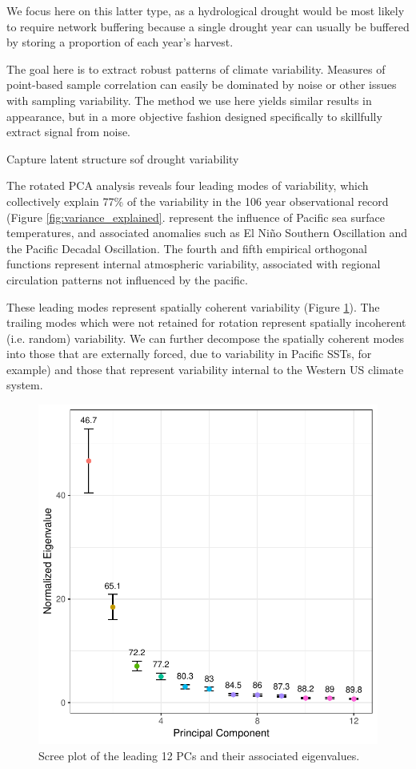\documentclass[fleqn,10pt]{wlscirep}
\begin{document}
We focus here on this latter type, as a hydrological drought would be most likely to require network buffering because a single drought year can usually be buffered by storing a proportion of each year’s harvest.

The goal here is to extract robust patterns of climate variability. Measures of point-based sample correlation can easily be dominated by noise or other issues with sampling variability. The method we use here yields similar results in appearance, but in a more objective fashion designed specifically to skillfully extract signal from noise.

Capture latent structure sof drought variability

The rotated PCA analysis reveals four leading modes of variability, which collectively explain 77\% of the variability in the 106 year observational record (Figure \ref{fig:variance_explained}. represent the influence of Pacific sea surface temperatures, and associated anomalies such as El Ni\~no Southern Oscillation and the Pacific Decadal Oscillation. The fourth and fifth empirical orthogonal functions represent internal atmospheric variability, associated with regional circulation patterns not influenced by the pacific.

These leading modes represent spatially coherent variability (Figure \ref{fig:reofs}). The trailing modes which were not retained for rotation represent spatially incoherent (i.e. random) variability. We can further decompose the spatially coherent modes into those that are externally forced, due to variability in Pacific SSTs, for example) and those that represent variability internal to the Western US climate system.

\begin{figure}[!htbp]
\centering
\includegraphics[width=.3\linewidth]{figures/variance_explained.pdf}
\caption{Scree plot of the leading 12 PCs and their associated eigenvalues.}
\label{fig:reofs}
\end{figure}
\end{document}
